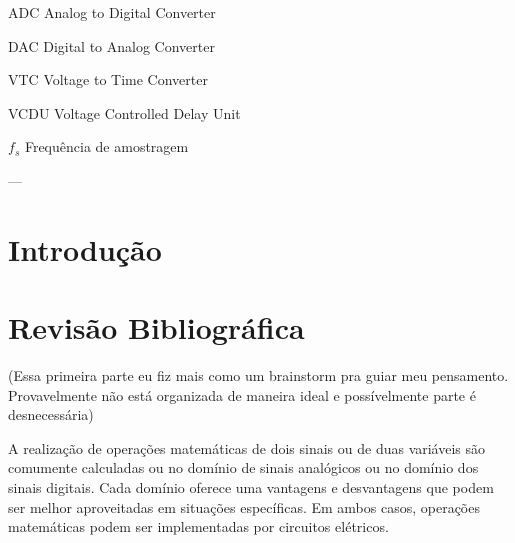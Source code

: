 \documentclass[
	12pt,				%
	openright,			%
	twoside,			%
	a4paper,			%
	english,			%
	french,				%
	spanish,			%
	brazil,				%
	]{abntex2}
\begin{document}

\begin{siglas}
	\item[ADC] Analog to Digital Converter
	\item[DAC] Digital to Analog Converter
	\item[VTC] Voltage to Time Converter
	\item[VCDU] Voltage Controlled Delay Unit
\end{siglas}

\begin{simbolos}
  \item[$ f_{s} $] Frequência de amostragem
\end{simbolos}
---

\tableofcontents*
\cleardoublepage

\textual


\chapter{Introdução}



\chapter{Revisão Bibliográfica}
	
	(Essa primeira parte eu fiz mais como um brainstorm pra guiar meu pensamento. Provavelmente não está organizada de maneira ideal e possívelmente parte é desnecessária)

	A realização de operações matemáticas de dois sinais ou de duas variáveis são comumente calculadas ou no domínio de sinais analógicos ou no domínio dos sinais digitais. Cada domínio oferece uma vantagens e desvantagens que podem ser melhor aproveitadas em situações específicas. Em ambos casos, operações matemáticas podem ser implementadas por circuitos elétricos.
\end{document}
